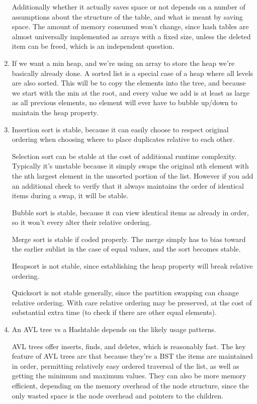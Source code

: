 \documentclass[12pt]{chmullighw}
\begin{document}
\begin{enumerate}
Additionally whether it actually saves space or not depends on a number of
assumptions about the structure of the table, and what is meant by saving space.
The amount of memory consumed won't change, since hash tables are almost
universally implemented as arrays with a fixed size, unless the deleted item can
be freed, which is an independent question.

\item If we want a min heap, and we're using an array to store the heap we're
basically already done. A sorted list is a special case of a heap where all
levels are also sorted. This will be  to copy the elements into the
tree, and because we start with the min at the root, and every value we add is
at least as large as all previous elements, no element will ever have to bubble
up/down to maintain the heap property.

\item Insertion sort is stable, because it can easily choose to respect original
ordering when choosing where to place duplicates relative to each other.

Selection sort can be stable at the cost of additional runtime complexity.
Typically it's unstable because it simply swaps the original nth element with
the nth largest element in the unsorted portion of the list. However if you add
an additional check to verify that it always maintains the order of identical
items during a swap, it will be stable.

Bubble sort is stable, because it can view identical items as already in order,
so it won't every alter their relative ordering.

Merge sort is stable if coded properly. The merge simply has to bias toward the
earlier sublist in the case of equal values, and the sort becomes stable.

Heapsort is not stable, since establishing the heap property will break relative
ordering.

Quicksort is not stable generally, since the partition swapping can change
relative ordering. With care relative ordering may be preserved, at the cost of
substantial extra time (to check if there are other equal elements).

\item An AVL tree vs a Hashtable depends on the likely usage patterns.

AVL trees offer  inserts, finds, and deletes, which is reasonably
fast. The key feature of AVL trees are that because they're a BST the items are
maintained in order, permitting relatively easy ordered traversal of the list,
as well as getting the minimum and maximum values. They can also be more memory
efficient, depending on the memory overhead of the node structure, since the
only wasted space is the node overhead and pointers to the children.


\end{enumerate}
\end{document}
